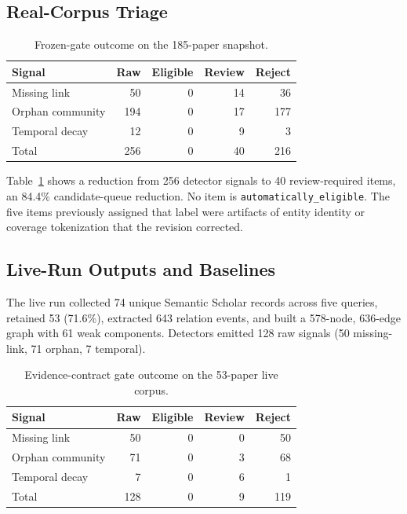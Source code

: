 \documentclass[conference, onecolumn]{IEEEtran}
\newcommand{\statuseligible}{\texttt{automatically\_eligible}}
\begin{document}
\subsection{Real-Corpus Triage}

\begin{table}[t]
\caption{Frozen-gate outcome on the 185-paper snapshot.}
\label{tab:real}
\centering
\begin{tabular}{lrrrr}
\toprule
Signal & Raw & Eligible & Review & Reject\\
\midrule
Missing link & 50 & 0 & 14 & 36\\
Orphan community & 194 & 0 & 17 & 177\\
Temporal decay & 12 & 0 & 9 & 3\\
\midrule
Total & 256 & 0 & 40 & 216\\
\bottomrule
\end{tabular}
\end{table}

Table~\ref{tab:real} shows a reduction from 256 detector signals to 40 review-required items, an 84.4\% candidate-queue reduction. No item is \statuseligible{}. The five items previously assigned that label were artifacts of entity identity or coverage tokenization that the revision corrected.

\subsection{Live-Run Outputs and Baselines}

The live run collected 74 unique Semantic Scholar records across five queries, retained 53 (71.6\%), extracted 643 relation events, and built a 578-node, 636-edge graph with 61 weak components. Detectors emitted 128 raw signals (50 missing-link, 71 orphan, 7 temporal).

\begin{table}[t]
\caption{Evidence-contract gate outcome on the 53-paper live corpus.}
\label{tab:live_gate}
\centering
\begin{tabular}{lrrrr}
\toprule
Signal & Raw & Eligible & Review & Reject\\
\midrule
Missing link & 50 & 0 & 0 & 50\\
Orphan community & 71 & 0 & 3 & 68\\
Temporal decay & 7 & 0 & 6 & 1\\
\midrule
Total & 128 & 0 & 9 & 119\\
\bottomrule
\end{tabular}
\end{table}
\end{document}
